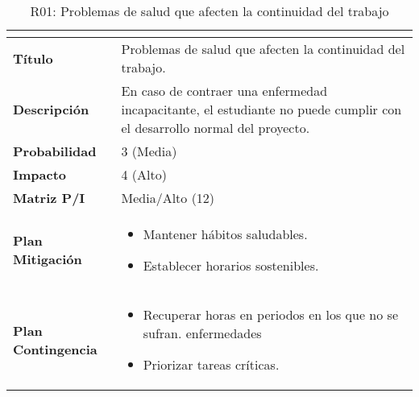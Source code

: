 \begin{table}[H]
\centering
\begin{tabular}{|>{\bfseries}l|p{10cm}|}
\hline
\rowcolor{lightgray}
\multicolumn{2}{|c|}{\textbf{Riesgo R01}} \\ \hline
Título & Problemas de salud que afecten la continuidad del trabajo. \\ \hline
Descripción & En caso de contraer una enfermedad incapacitante, el estudiante no puede cumplir con el desarrollo normal del proyecto. \\ \hline
Probabilidad & 3 (Media) \\ \hline
Impacto & 4 (Alto) \\ \hline
Matriz P/I & Media/Alto (12) \\ \hline
Plan Mitigación & 
\begin{itemize}
\item Mantener hábitos saludables.
\item Establecer horarios sostenibles.
\end{itemize} \\ \hline
Plan Contingencia & 
\begin{itemize}
\item Recuperar horas en periodos en los que no se sufran. enfermedades
\item Priorizar tareas críticas.
\end{itemize} \\ \hline
\end{tabular}
\caption{R01: Problemas de salud que afecten la continuidad del trabajo}
\label{tab:R01}
\end{table}

